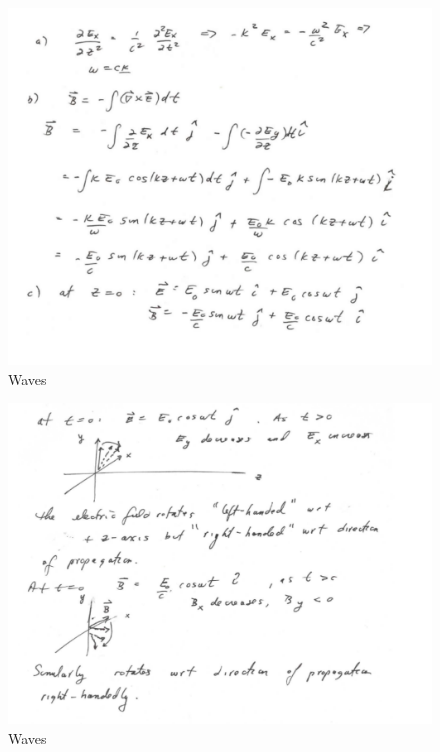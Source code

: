 \documentclass[makesolutionspdf]{esg8022pset}
\begin{document}
\begin{solution}
\begin{figure}[H]
    \centering
    \includegraphics[width = 15cm]{waves2sola}
   \caption{Waves}
  \end{figure}
  \begin{figure}[H]
    \centering
    \includegraphics[width = 15cm]{waves2solb}
   \caption{Waves}
  \end{figure}
\end{solution}
\end{document}
